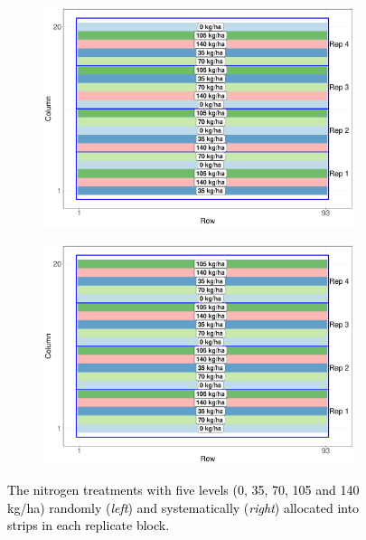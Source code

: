\documentclass[a4paper]{article} 	%
\newcommand{\revision}[1]{\textcolor{black}{#1}}
\begin{document}
\begin{figure}[!htp]
	\begin{subfigure}[t]{0.45\textwidth}
		\centering
		\includegraphics[width=\linewidth]{Col_RandNitro_V4.pdf}
	\end{subfigure}
	\hspace{0.05\textwidth}
	\begin{subfigure}[t]{0.45\textwidth}
		\centering
		\includegraphics[width=\linewidth]{Col_SystNitro_V4.pdf}
	\end{subfigure}
	\caption{\revision{The nitrogen treatments with five levels (0, 35, 70, 105 and 140 kg/ha) randomly (\textit{left}) and systematically (\textit{right}) allocated into strips in each replicate block.}}\label{fig:Nitrogen}
\end{figure}
\end{document}
